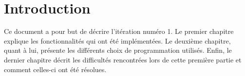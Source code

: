 \section{Introduction}
Ce document a pour but de décrire l'itération numéro 1. Le premier chapitre explique les fonctionnalités qui ont été implémentées. Le deuxième chapitre, quant à lui, présente les différents choix de programmation utilisés. Enfin, le dernier chapitre décrit les difficultés rencontrées lors de cette première partie et comment celles-ci ont été résolues.